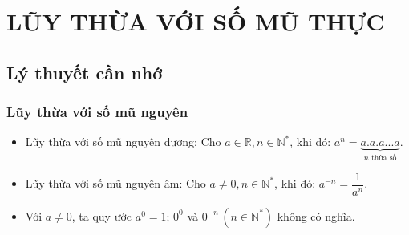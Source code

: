 \setcounter{dang}{0}
\setcounter{section}{17}
\section{LŨY THỪA VỚI SỐ MŨ THỰC}
\subsection{Lý thuyết cần nhớ}
\subsubsection{Lũy thừa với số mũ nguyên}
	\begin{itemize}
		\item [\iconCH] Lũy thừa với số mũ nguyên dương: Cho $a\in \mathbb{R}, n\in {\mathbb{N}}^{*}$, khi đó: $a^n=\underbrace{a.a.a...a}_{n \text{ thừa số}}$.
		\item [\iconCH] Lũy thừa với số mũ nguyên âm: Cho $a \ne 0, n\in {\mathbb{N}}^{*}$, khi đó: $a^{-n}=\dfrac{1}{a^n}$.
		\item [\iconCH] Với $a \ne 0$, ta quy ước $a^0=1$; \quad $0^0$ và $0^{-n}\, (n \in \mathbb{N}^{*})$ không có nghĩa.
	\end{itemize}

